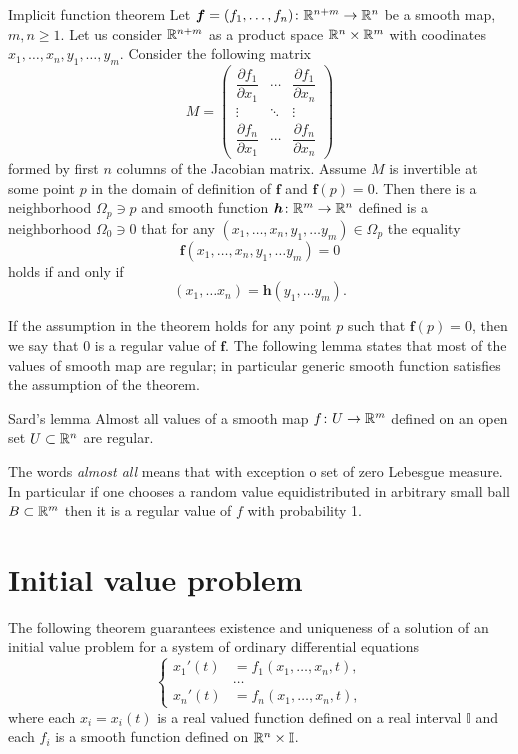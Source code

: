 \begin{thm}{Implicit function theorem}\label{thm:imlicit}
Let $\bm{f}=(f_1,\dots,f_n)\colon\mathbb{R}^{n+m}\to\mathbb{R}^n$ be a smooth map,
$m,n\ge 1$.
Let us consider $\mathbb{R}^{n+m}$ as a product space $\mathbb{R}^n\times \mathbb{R}^m$ with coodinates 
$x_1,\dots,x_n,y_1,\dots,y_m$.
Consider the following matrix 
\[
M=\begin{pmatrix}
\dfrac{\partial f_1}{\partial x_1} & \cdots & \dfrac{\partial f_1}{\partial x_n}\\
\vdots & \ddots & \vdots\\
\dfrac{\partial f_n}{\partial x_1} & \cdots & \dfrac{\partial f_n}{\partial x_n} \end{pmatrix}\]
formed by first $n$ columns of the Jacobian matrix.
Assume $M$ is invertible at some point $p$ in the domain of definition of $\bm{f}$ and $\bm{f}(p)=0$.
Then there is a neighborhood $\Omega_p\ni p$
and smooth function $\bm{h}\colon\mathbb{R}^m\to\mathbb{R}^n$ defined is a neighborhood $\Omega_0\ni 0$ that
for any $(x_1,\dots,x_n,y_1,\dots y_m)\in \Omega_p$ the equality
\[\bm{f}(x_1,\dots,x_n,y_1,\dots y_m)=0\]
holds if and only if 
\[(x_1,\dots x_n)=\bm{h}(y_1,\dots y_m).\]

\end{thm}

If the assumption in the theorem holds for any point $p$ such that $\bm{f}(p)=0$,
then we say that $0$ is a regular value of $\bm{f}$.
The following lemma states that most of the values of smooth map are regular;
in particular generic smooth function satisfies the assumption of the theorem.

\begin{thm}{Sard's lemma}
Almost all values of a smooth map $f\colon U \z\to \RR^m$ defined on an open set $U\subset \mathbb{R}^n$ are regular.
\end{thm}

The words \emph{almost all} means that with exception o set of zero Lebesgue measure.
In particular if one chooses a random value equidistributed in arbitrary small ball $B\subset \mathbb{R}^m$ then it is a regular value of $f$ with probability 1.






\section{Initial value problem}

The following theorem guarantees existence and uniqueness of a solution of an initial value problem
for a system of ordinary differential equations
\[
\begin{cases}
x_1'(t)&=f_1(x_1,\dots,x_n,t),
\\
&\dots
\\
x_n'(t)&=f_n(x_1,\dots,x_n,t),
\end{cases}
\]
where each $x_i=x_i(t)$ is a real valued function defined on a real interval $\mathbb{I}$
and each $f_i$ is a smooth function defined on $\mathbb{R}^n\times \mathbb{I}$.

